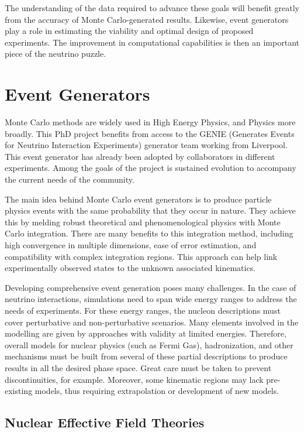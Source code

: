 The understanding of the data required to advance these goals will benefit greatly from the accuracy of Monte Carlo-generated results. Likewise, event generators play a role in estimating the viability and optimal design of proposed experiments. The improvement in computational capabilities is then an important piece of the neutrino puzzle.

\section{Event Generators}

Monte Carlo methods are widely used in High Energy Physics, and Physics more broadly. This PhD project benefits from access to the GENIE (Generates Events for Neutrino Interaction Experiments) generator team working from Liverpool. This event generator has already been adopted by collaborators in different experiments. Among the goals of the project is sustained evolution to accompany the current needs of the community. 

The main idea behind Monte Carlo event generators is to produce particle physics events with the same probability that they occur in nature. They achieve this by melding robust theoretical and phenomenological physics with Monte Carlo integration. There are many benefits to this integration method, including high convergence in multiple dimensions, ease of error estimation, and compatibility with complex integration regions. This approach can help link experimentally observed states to the unknown associated kinematics.

Developing comprehensive event generation poses many challenges. In the case of neutrino interactions, simulations need to span wide energy ranges to address the needs of experiments. For these energy ranges, the nucleon descriptions must cover perturbative and non-perturbative scenarios. Many elements involved in the modelling are given by approaches with validity at limited energies. Therefore, overall models for nuclear physics (such as Fermi Gas), hadronization, and other mechanisms must be built from several of these partial descriptions to produce results in all the desired phase space. Great care must be taken to prevent discontinuities, for example. Moreover, some kinematic regions may lack pre-existing models, thus requiring extrapolation or development of new models\cite{Andreopoulos2021}.

\subsection{Nuclear Effective Field Theories}

